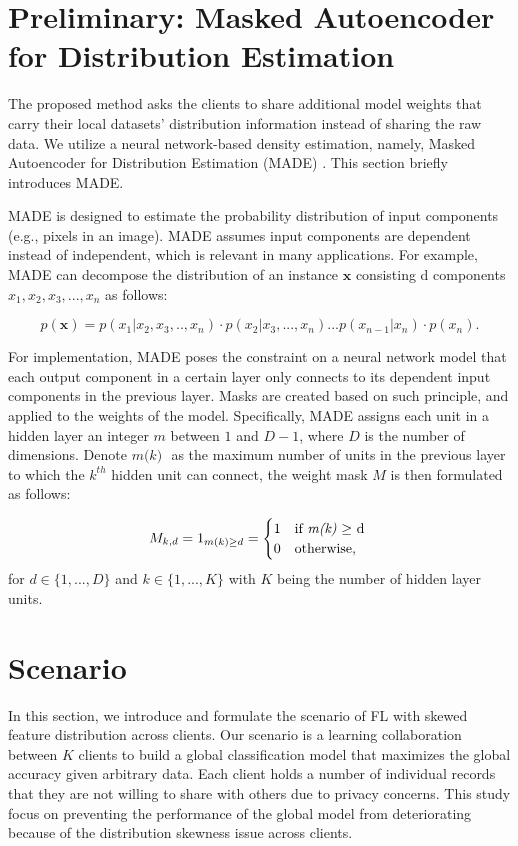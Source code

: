 \section{Preliminary: Masked Autoencoder for Distribution Estimation}
\label{sec:made}
The proposed method asks the clients to share additional model weights that carry their local datasets' distribution information instead of sharing the raw data. We utilize a neural network-based density estimation, namely, Masked Autoencoder for Distribution Estimation (MADE) \cite{MADE}. This section briefly introduces MADE.

MADE is designed to estimate the probability distribution of input components (e.g., pixels in an image). MADE assumes input components are dependent instead of independent, which is relevant in many applications. For example, MADE can decompose the distribution of an instance $\textbf{x}$ consisting d components $x_1, x_2, x_3, ..., x_n$ as follows:

\begin{equation}
\label{eq:MADE_decomposition}
p(\mathbf{x}) =   p(x_1|x_2,x_3,..,x_n) \cdot p(x_2|x_3,...,x_n) 
...p(x_{n-1}|x_n) \cdot p(x_n). 
\end{equation}

For implementation, MADE poses the constraint on a neural network model that each output component in a certain layer only connects to its dependent input components in the previous layer. Masks are created based on such principle, and applied to the weights of the model.
Specifically, MADE assigns each unit in a hidden layer an integer $\textit{m}$ between $1$ and $D-1$, where $D$ is the number of dimensions. Denote $\textit{m(k) } $ as the maximum number of units in the previous layer to which the $\textit{k}^{th}$ hidden unit can connect, the weight mask $M$ is then formulated as follows:

\begin{equation}
 M_{k,d} = 1_{m(k) \geq d} = 
				 \begin{cases}
				  1 & \text{if \textit{m(k)} $\geq$ d }\\
				  0 & \text{otherwise,}
				 \end{cases} 
\end{equation}
for $d \in \{1,...,D\}$ and $k \in \{1,...,K \}$ with $K$ being the number of hidden layer units.


\section{Scenario}
\label{sec:FedProblem}
In this section, we introduce and formulate the scenario of FL with skewed feature distribution across clients. 
Our scenario is a learning collaboration between $K$ clients to build a global classification model that maximizes the global accuracy given arbitrary data. Each client holds a number of individual records that they are not willing to share with others due to privacy concerns. This study focus on preventing the performance of the global model from deteriorating because of the distribution skewness issue \cite{survey} across clients.

